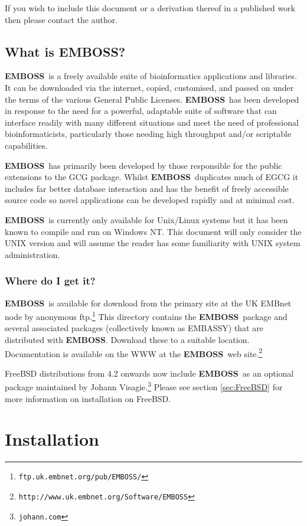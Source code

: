 \documentclass{report}
\newcommand{\URL}[1]{\footnote{{\tt #1}}}
\newcommand{\EMBOSS}{{\sf\bfseries EMBOSS}}
\begin{document}
If you wish to include this document or a derivation thereof in a published work then please contact the author.

\section{What is \EMBOSS?}

\EMBOSS\ is a freely available suite of bioinformatics applications and libraries. It can be downloaded via the internet, copied, customised, and passed on under the terms of  the various General Public Licenses.  \EMBOSS\ has been developed in response to the need for a powerful, adaptable suite of software that can interface readily with many different situations and meet the need of professional bioinformaticists, particularly those needing high throughput and/or scriptable capabilities.

\EMBOSS\ has primarily been developed by those responsible for the public extensions to the GCG package. Whilst \EMBOSS\ duplicates much of EGCG it includes far better database interaction and has the benefit of freely accessible source code so novel applications can be developed rapidly and at minimal cost.

\EMBOSS\ is currently only available for Unix/Linux systems but it has been known to compile and run on Windows NT. This document will only consider the UNIX version and will assume the reader has some familiarity with UNIX system administration.

\subsection{Where do I get it?}

\EMBOSS\ is available for download from the primary site at the UK EMBnet node by anonymous ftp.\URL{ftp.uk.embnet.org/pub/EMBOSS/} 
This directory contains the \EMBOSS\ package and several associated packages (collectively known as EMBASSY) that are distributed with \EMBOSS. Download these to a suitable location. Documentation is available on the WWW at the \EMBOSS\ web site.\URL{http://www.uk.embnet.org/Software/EMBOSS}

FreeBSD distributions from 4.2 onwards now include \EMBOSS\ as an optional package maintained by Johann Visagie.\URL{johann\@@egenetics.com} Please see section \ref{sec:FreeBSD} for more information on installation on FreeBSD.

\chapter{Installation}
\end{document}
